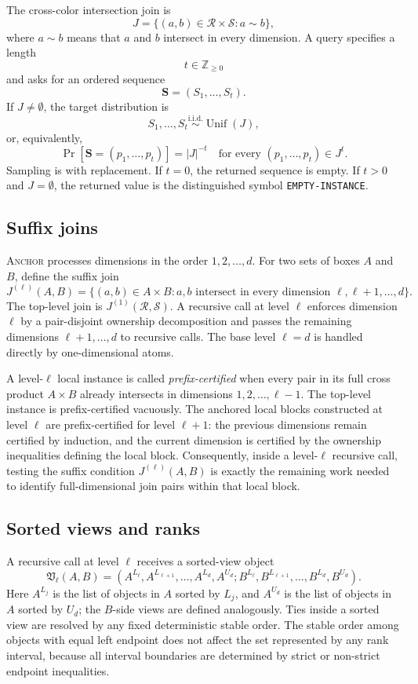 \documentclass[11pt]{article}
\DeclareRobustCommand{\ANCHOR}{\textnormal{\textsc{Anchor}}}
\newcommand{\Unif}{\operatorname{Unif}}
\newcommand{\code}[1]{\texttt{#1}}
\theoremstyle{definition}
\begin{document}
The cross-color intersection join is
\[
  J=\{(a,b)\in\mathcal R\times\mathcal S: a\sim b\},
\]
where $a\sim b$ means that $a$ and $b$ intersect in every dimension.  A query specifies a length
\[
  t\in\mathbb Z_{\ge0}
\]
and asks for an ordered sequence
\[
  \mathbf S=(S_1,\ldots,S_t).
\]
If $J\ne\emptyset$, the target distribution is
\[
  S_1,\ldots,S_t\overset{\mathrm{i.i.d.}}{\sim}\Unif(J),
\]
or, equivalently,
\[
  \Pr[\mathbf S=(p_1,\ldots,p_t)]=|J|^{-t}
  \quad\text{for every }(p_1,\ldots,p_t)\in J^t.
\]
Sampling is with replacement.  If $t=0$, the returned sequence is empty.  If $t>0$ and $J=\emptyset$, the returned value is the distinguished symbol \code{EMPTY-INSTANCE}.

\subsection{Suffix joins}

\ANCHOR{} processes dimensions in the order $1,2,\ldots,d$.  For two sets of boxes $A$ and $B$, define the suffix join
\[
  J^{(\ell)}(A,B)=
  \{(a,b)\in A\times B:
    a,b\text{ intersect in every dimension }\ell,\ell+1,\ldots,d\}.
\]
The top-level join is $J^{(1)}(\mathcal R,\mathcal S)$.  A recursive call at level $\ell$ enforces dimension $\ell$ by a pair-disjoint ownership decomposition and passes the remaining dimensions $\ell+1,\ldots,d$ to recursive calls.  The base level $\ell=d$ is handled directly by one-dimensional atoms.

A level-$\ell$ local instance is called \emph{prefix-certified} when every pair in its full cross product $A\times B$ already intersects in dimensions $1,2,\ldots,\ell-1$.  The top-level instance is prefix-certified vacuously.  The anchored local blocks constructed at level $\ell$ are prefix-certified for level $\ell+1$: the previous dimensions remain certified by induction, and the current dimension is certified by the ownership inequalities defining the local block.  Consequently, inside a level-$\ell$ recursive call, testing the suffix condition $J^{(\ell)}(A,B)$ is exactly the remaining work needed to identify full-dimensional join pairs within that local block.

\subsection{Sorted views and ranks}

A recursive call at level $\ell$ receives a sorted-view object
\[
  \mathfrak V_\ell(A,B)=
  (A^{L_\ell},A^{L_{\ell+1}},\ldots,A^{L_d},A^{U_d};
   B^{L_\ell},B^{L_{\ell+1}},\ldots,B^{L_d},B^{U_d}).
\]
Here $A^{L_j}$ is the list of objects in $A$ sorted by $L_j$, and $A^{U_d}$ is the list of objects in $A$ sorted by $U_d$; the $B$-side views are defined analogously.  Ties inside a sorted view are resolved by any fixed deterministic stable order.  The stable order among objects with equal left endpoint does not affect the set represented by any rank interval, because all interval boundaries are determined by strict or non-strict endpoint inequalities.
\end{document}
